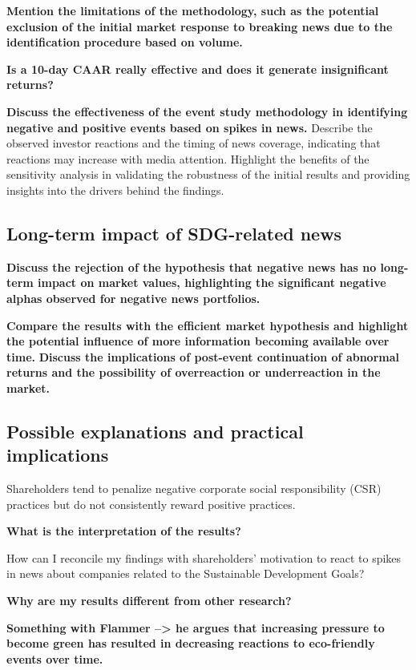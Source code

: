 \textbf{Mention the limitations of the methodology, such as the potential exclusion of the initial market response to breaking news due to the identification procedure based on volume.}

\textbf{Is a 10-day CAAR really effective and does it generate insignificant returns?}

\textbf{Discuss the effectiveness of the event study methodology in identifying negative and positive events based on spikes in news.}
Describe the observed investor reactions and the timing of news coverage, indicating that reactions may increase with media attention. Highlight the benefits of the sensitivity analysis in validating the robustness of the initial results and providing insights into the drivers behind the findings.




\subsection{Long-term impact of SDG-related news}
\textbf{Discuss the rejection of the hypothesis that negative news has no long-term impact on market values, highlighting the significant negative alphas observed for negative news portfolios.}

\textbf{Compare the results with the efficient market hypothesis and highlight the potential influence of more information becoming available over time.}
\textbf{Discuss the implications of post-event continuation of abnormal returns and the possibility of overreaction or underreaction in the market.}


\subsection{Possible explanations and practical implications}

Shareholders tend to penalize negative corporate social responsibility (CSR) practices but do not consistently reward positive practices. 

\textbf{What is the interpretation of the results?}

How can I reconcile my findings with shareholders' motivation to react to spikes in news about companies related to the Sustainable Development Goals? 


\textbf{Why are my results different from other research?}

\textbf{Something with Flammer --> he argues that increasing pressure to become green has resulted in decreasing reactions to eco-friendly events over time.}


